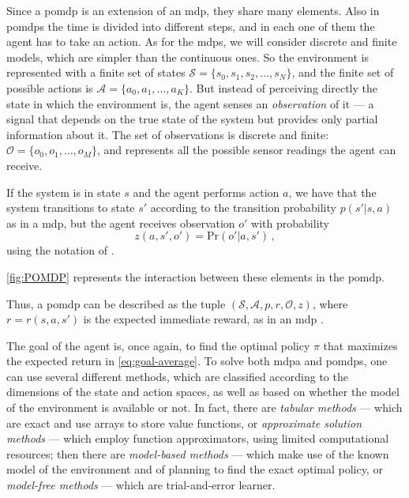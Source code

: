 Since a \acrshort{pomdp} is an extension of an \acrshort{mdp}, they share many elements. Also in \acrshort{pomdp}s the time is divided into different steps, and in each one of them the agent has to take an action. As for the \acrshort{mdp}s, we will consider discrete and finite models, which are simpler than the continuous ones. So the environment is represented with a finite set of states $\mathcal S = \{ s_0, s_1, s_2, \ldots, s_N \}$, and the finite set of possible actions is $\mathcal A = \{a_0, a_1, \ldots, a_K\}$. But instead of perceiving directly the state in which the environment is, the agent senses an \emph{observation} of it --- a signal that depends on the true state of the system but provides only partial information about it. The set of observations is discrete and finite: $\mathcal O = \{o_0, o_1, \ldots, o_M\}$, and represents all the possible sensor readings the agent can receive.

If the system is in state $s$ and the agent performs action $a$, we have that the system transitions to state $s'$ according to the transition probability $p(s' | s, a)$ as in a \acrshort{mdp}, but the agent receives observation $o'$ with probability
\begin{equation}
    z(a,s',o') = \text{Pr}(o' | a, s') \, ,
\end{equation}
using the notation of \cite{Poupart2010}.

\autoref{fig:POMDP} represents the interaction between these elements in the \acrshort{pomdp}.

Thus, a \acrshort{pomdp} can be described as the tuple $(\mathcal S, \mathcal A, p, r, \mathcal O, z)$, where $r = r(s,a,s')$ is the expected immediate reward, as in an \acrshort{mdp} \cite{Kaelbling1998}.

The goal of the agent is, once again, to find the optimal policy $\pi$ that maximizes the expected return in \eqref{eq:goal-average}. To solve both \acrshort{mdp}a and \acrshort{pomdp}s, one can use several different methods, which are classified according to the dimensions of the state and action spaces, as well as based on whether the model of the environment is available or not. In fact, there are \emph{tabular methods} --- which are exact and use arrays to store value functions, or \emph{approximate solution methods} --- which employ function approximators, using limited computational resources; then there are \emph{model-based methods} --- which make use of the known model of the environment and of planning to find the exact optimal policy, or \emph{model-free methods} --- which are trial-and-error learner.

